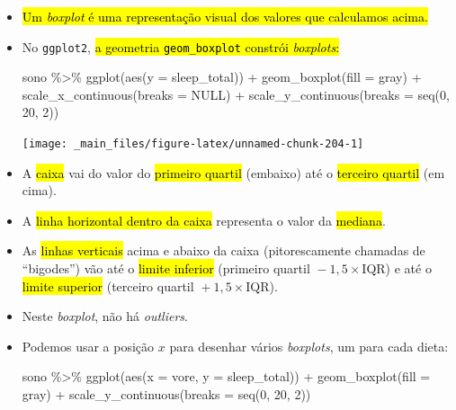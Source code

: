 \documentclass[
  11pt]{report}
\newenvironment{Shaded}{\begin{snugshade}}{\end{snugshade}}
\newcommand{\AttributeTok}[1]{\textcolor[rgb]{0.77,0.63,0.00}{#1}}
\newcommand{\ConstantTok}[1]{\textcolor[rgb]{0.00,0.00,0.00}{#1}}
\newcommand{\DecValTok}[1]{\textcolor[rgb]{0.00,0.00,0.81}{#1}}
\newcommand{\FunctionTok}[1]{\textcolor[rgb]{0.00,0.00,0.00}{#1}}
\newcommand{\NormalTok}[1]{#1}
\newcommand{\SpecialCharTok}[1]{\textcolor[rgb]{0.00,0.00,0.00}{#1}}
\newcommand{\StringTok}[1]{\textcolor[rgb]{0.31,0.60,0.02}{#1}}
\renewenvironment{Shaded}{
    \begin{mdframed}[%
      roundcorner=2pt,%
      innerleftmargin=5pt,%
      innerrightmargin=5pt,%
      topline=true,%
      leftline=true,%
      rightline=true,%
      bottomline=true,%
      linewidth=0.5pt,%
      linecolor=black!20,%
      backgroundcolor=black!2,%
      skipabove=2ex,%
      skipbelow=2.5ex%
    ]%
  }
  {
    \end{mdframed}
  }
\begin{document}
\begin{itemize}
\item
  {\hl{Um \emph{boxplot} é uma representação visual dos valores que calculamos acima.}}
\item
  No \texttt{ggplot2}, {\hl{a geometria {\mbox{\texttt{geom\_boxplot}}} constrói \emph{boxplots}:}}

\begin{Shaded}
\begin{Highlighting}[]
\NormalTok{sono }\SpecialCharTok{\%\textgreater{}\%} 
  \FunctionTok{ggplot}\NormalTok{(}\FunctionTok{aes}\NormalTok{(}\AttributeTok{y =}\NormalTok{ sleep\_total)) }\SpecialCharTok{+}
    \FunctionTok{geom\_boxplot}\NormalTok{(}\AttributeTok{fill =} \StringTok{\textquotesingle{}gray\textquotesingle{}}\NormalTok{) }\SpecialCharTok{+}
    \FunctionTok{scale\_x\_continuous}\NormalTok{(}\AttributeTok{breaks =} \ConstantTok{NULL}\NormalTok{) }\SpecialCharTok{+}
    \FunctionTok{scale\_y\_continuous}\NormalTok{(}\AttributeTok{breaks =} \FunctionTok{seq}\NormalTok{(}\DecValTok{0}\NormalTok{, }\DecValTok{20}\NormalTok{, }\DecValTok{2}\NormalTok{))}
\end{Highlighting}
\end{Shaded}

  \begin{center}\texttt{[image: \_main\_files/figure-latex/unnamed-chunk-204-1]} \end{center}
\item
  A {\hl{caixa}} vai do valor do {\hl{primeiro quartil}} (embaixo) até o {\hl{terceiro quartil}} (em cima).
\item
  A {\hl{linha horizontal dentro da caixa}} representa o valor da {\hl{mediana}}.
\item
  As {\hl{linhas verticais}} acima e abaixo da caixa (pitorescamente chamadas de ``bigodes'') vão até o {\hl{limite inferior}} (primeiro quartil ${}- 1{,}5 \times \text{IQR}$) e até o {\hl{limite superior}} (terceiro quartil ${}+ 1{,}5 \times \text{IQR}$).
\item
  Neste \emph{boxplot}, não há \emph{outliers}.
\item
  \protect\hypertarget{onivoros}{}{} Podemos usar a posição $x$ para desenhar vários \emph{boxplots}, um para cada dieta:

\begin{Shaded}
\begin{Highlighting}[]
\NormalTok{sono }\SpecialCharTok{\%\textgreater{}\%} 
  \FunctionTok{ggplot}\NormalTok{(}\FunctionTok{aes}\NormalTok{(}\AttributeTok{x =}\NormalTok{ vore, }\AttributeTok{y =}\NormalTok{ sleep\_total)) }\SpecialCharTok{+}
    \FunctionTok{geom\_boxplot}\NormalTok{(}\AttributeTok{fill =} \StringTok{\textquotesingle{}gray\textquotesingle{}}\NormalTok{) }\SpecialCharTok{+}
    \FunctionTok{scale\_y\_continuous}\NormalTok{(}\AttributeTok{breaks =} \FunctionTok{seq}\NormalTok{(}\DecValTok{0}\NormalTok{, }\DecValTok{20}\NormalTok{, }\DecValTok{2}\NormalTok{))}
\end{Highlighting}
\end{Shaded}


\end{itemize}
\end{document}
